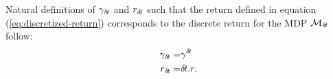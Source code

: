 Natural definitions of $\gamma_{\delta\hspace{-.1em}t}$ and $r_{\delta\hspace{-.1em}t}$ such
that the return defined in equation (\ref{eq:discretized-return}) corresponds
to the discrete return for the MDP ${\cal M}_{\delta\hspace{-.1em}t}$ follow:
\begin{align}
\label{eq:def-gamma}
\gamma_{\delta\hspace{-.1em}t} =& \gamma^{\delta\hspace{-.1em}t}\\
\label{eq:def-reward}
r_{\delta\hspace{-.1em}t} =& {\delta\hspace{-.1em}t} . r.
\end{align}





